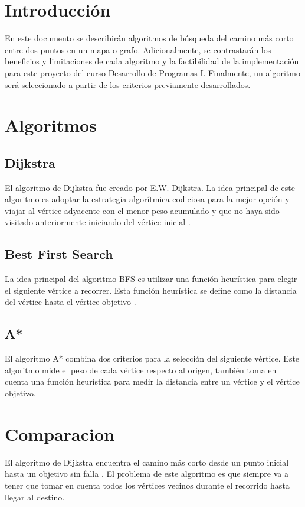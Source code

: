 \documentclass{article}
\begin{document}


\tableofcontents

\cleardoublepage{}

\section{Introducción}
En este documento se describirán algoritmos de búsqueda del camino más corto entre
dos puntos en un mapa o grafo. Adicionalmente, se contrastarán los beneficios y
limitaciones de cada algoritmo y la factibilidad de la implementación para este
proyecto del curso Desarrollo de Programas I. Finalmente, un algoritmo será
seleccionado a partir de los criterios previamente desarrollados.

\section{Algoritmos}
\subsection{Dijkstra}
El algoritmo de Dijkstra fue creado por E.W. Dijkstra. La idea principal de este
algoritmo es adoptar la estrategia algorítmica codiciosa para la mejor opción y
viajar al vértice adyacente con el menor peso acumulado y que no haya sido visitado
anteriormente iniciando del vértice inicial \autocite{tongpan}.

\subsection{Best First Search}
La idea principal del algoritmo BFS es utilizar una función heurística para elegir
el siguiente vértice a recorrer. Esta función heurística se define como la distancia
del vértice hasta el vértice objetivo \autocite{mehta}.

\subsection{A*}
El algoritmo A* combina dos criterios para la selección del siguiente vértice. Este
algoritmo mide el peso de cada vértice respecto al origen, también toma en cuenta
una función heurística para medir la distancia entre un vértice y el vértice objetivo.

\section{Comparacion}
El algoritmo de Dijkstra encuentra el camino más corto desde un punto inicial hasta
un objetivo sin falla \autocite{minhang}. El problema de este algoritmo es que siempre
va a tener que tomar en cuenta todos los vértices vecinos durante el recorrido
hasta llegar al destino.
\end{document}
